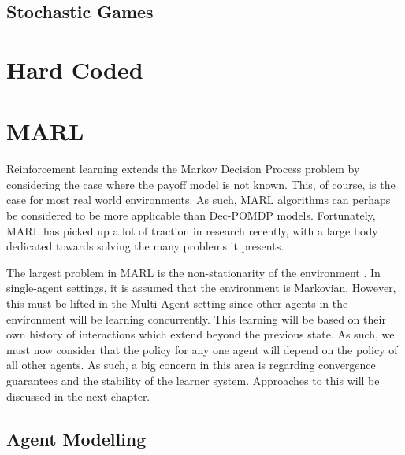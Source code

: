 \documentclass[preprint,11pt]{report}
\begin{document}
\subsection*{Stochastic Games}

\section{Hard Coded}

\section{MARL}

Reinforcement learning extends the Markov Decision Process problem by considering the case where the
payoff model is not known. This, of course, is the case for most real world environments. As such,
MARL algorithms can perhaps be considered to be more applicable than Dec-POMDP models. Fortunately,
MARL has picked up a lot of traction in research recently, with a large body dedicated towards
solving the many problems it presents.

The largest problem in MARL is the non-stationarity of the environment \cite{Hernandez-LealA}. In
single-agent settings, it is assumed that the environment is Markovian. However, this must be lifted
in the Multi Agent setting since other agents in the environment will be learning concurrently. This
learning will be based on their own history of interactions which extend beyond the previous state.
As such, we must now consider that the policy for any one agent will depend on the policy of all
other agents. As such, a big concern in this area is regarding convergence guarantees and the
stability of the learner system. Approaches to this will be discussed in the next chapter. 

\subsection*{Agent Modelling}
\end{document}
